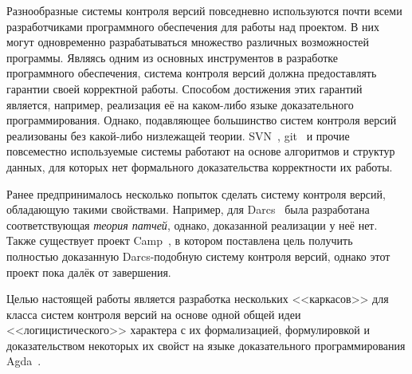 \startprefacepage

Разнообразные системы контроля версий повседневно используются почти
всеми разработчиками программного обеспечения для работы над проектом.
В них могут одновременно разрабатываться множество различных
возможностей программы. Являясь одним из основных инструментов в
разработке программного обеспечения, система контроля версий должна
предоставлять гарантии своей корректной работы. Способом достижения
этих гарантий является, например, реализация её на каком-либо языке
доказательного программирования. Однако, подавляющее большинство
систем контроля версий реализованы без какой-либо низлежащей теории.
SVN~\cite{svnbook}, git~\cite{git} и прочие повсеместно используемые
системы работают на основе алгоритмов и структур данных, для которых
нет формального доказательства корректности их работы.



Ранее предпринималось несколько попыток сделать систему контроля
версий, обладающую такими свойствами. Например, для Darcs~\cite{darcs}
была разработана соответствующая \emph{теория патчей}, однако,
доказанной реализации у неё нет. Также существует проект
Camp~\cite{camp}, в котором поставлена цель получить полностью
доказанную Darcs-подобную систему контроля версий, однако этот проект
пока далёк от завершения.

Целью настоящей работы является разработка нескольких <<каркасов>> для
класса систем контроля версий на основе одной общей идеи
<<логицистического>> характера с их формализацией, формулировкой и
доказательством некоторых их свойст на языке доказательного
программирования Agda~\cite{agda}.
